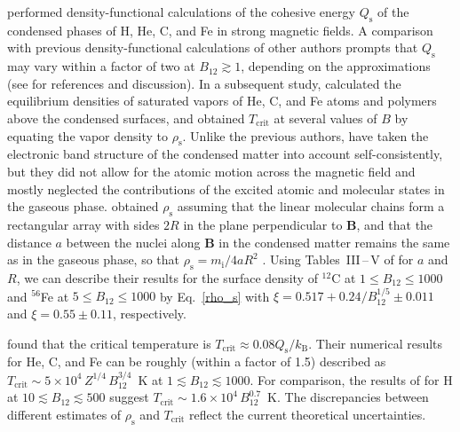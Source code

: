 \documentclass[traditabstract]{aa}
\newcommand{\req}[1]{Eq.~\ref{#1}}
\newcommand{\mion}{m_\mathrm{i}}
\newcommand{\kB}{k_\mathrm{B}}
\newcommand{\rhos}{\rho_\mathrm{s}}
\begin{document}
\citet{MedinLai06} performed density-functional calculations
of the cohesive energy $Q_\mathrm{s}$ of the condensed phases of
H, He, C, and Fe in strong magnetic fields. A comparison
with previous density-functional calculations of other
authors prompts that $Q_\mathrm{s}$ may vary within a factor of
two at $B_{12}\gtrsim1$, depending on the approximations
(see \citealp{MedinLai06} for references and discussion). In
a subsequent study, \citet{MedinLai07} calculated the
equilibrium densities of saturated vapors of He, C, and Fe
atoms and polymers above the condensed surfaces, and 
obtained $T_\mathrm{crit}$ at several values of $B$ 
by
equating the vapor density to $\rhos$.
 Unlike
the previous authors, \citet{MedinLai06,MedinLai07} have
taken the electronic band structure of the condensed matter
into account self-consistently, but they did not allow for
the atomic motion across the magnetic field and mostly
neglected the contributions of the excited atomic and
molecular states in the gaseous phase.
\citeauthor{MedinLai07} obtained $\rhos$  assuming that the
linear molecular chains form a
rectangular array with sides $2R$ in the plane
 perpendicular to ${\bm B}$,
and that the distance $a$ between the nuclei along ${\bm B}$
in the condensed matter remains the same as in the
gaseous phase, so that $\rhos=\mion/4aR^2$
\citep{Medin12}. Using Tables~III\,--\,V of
\citet{MedinLai06} for $a$ and $R$, we can describe their
results for the surface  density of $^{12}$C at $1\leqslant
B_{12} \leqslant 1000$ and  $^{56}$Fe at $5\leqslant B_{12}
\leqslant 1000$ by \req{rho_s} with
$\xi=0.517+0.24/B_{12}^{1/5}\pm0.011$ and $\xi=0.55\pm0.11$,
respectively.

 \citet{MedinLai07}
found that the critical temperature is
$T_\mathrm{crit}\approx0.08 Q_\mathrm{s}/\kB$. 
Their numerical results
for He, C, and Fe can be roughly (within a factor of
1.5) described
as
$T_\mathrm{crit} \sim 5\times10^4\,Z^{1/4}\,B_{12}^{3/4}$~K
at $1\lesssim B_{12}\lesssim1000$. For comparison, the
results of \citet{LaiSalpeter97}
 for H at
$10\lesssim B_{12}\lesssim500$
 suggest $T_\mathrm{crit}
\sim 1.6\times10^4\,B_{12}^{0.7}$~K. The discrepancies between
different estimates 
of $\rhos$ and $T_\mathrm{crit}$
reflect the current theoretical
uncertainties.
\end{document}
